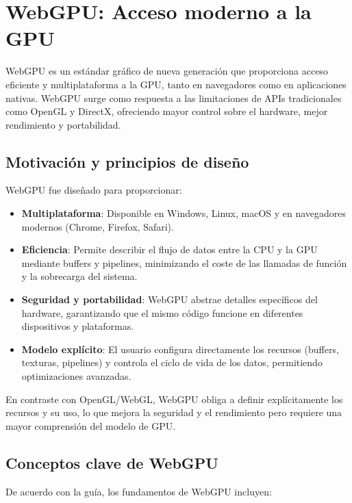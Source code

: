 \section{WebGPU: Acceso moderno a la GPU}

WebGPU es un estándar gráfico de nueva generación que proporciona acceso
eficiente y multiplataforma a la GPU, tanto en navegadores como en aplicaciones
nativas. WebGPU surge como respuesta a las limitaciones de APIs tradicionales
como OpenGL y DirectX, ofreciendo mayor control sobre el hardware, mejor
rendimiento y portabilidad.

\subsection{Motivación y principios de diseño}

WebGPU fue diseñado para proporcionar:

\begin{itemize}
    \item \textbf{Multiplataforma}: Disponible en Windows, Linux, macOS y en navegadores modernos (Chrome, Firefox, Safari).
    \item \textbf{Eficiencia}: Permite describir el flujo de datos entre la CPU y la GPU mediante buffers y pipelines, minimizando el coste de las llamadas de función y la sobrecarga del sistema.
    \item \textbf{Seguridad y portabilidad}: WebGPU abstrae detalles específicos del hardware, garantizando que el mismo código funcione en diferentes dispositivos y plataformas.
    \item \textbf{Modelo explícito}: El usuario configura directamente los recursos (buffers, texturas, pipelines) y controla el ciclo de vida de los datos, permitiendo optimizaciones avanzadas.
\end{itemize}

En contraste con OpenGL/WebGL, WebGPU obliga a definir explícitamente los
recursos y su uso, lo que mejora la seguridad y el rendimiento pero requiere
una mayor comprensión del modelo de GPU.

\subsection{Conceptos clave de WebGPU}

De acuerdo con la guía, los fundamentos de WebGPU incluyen:

